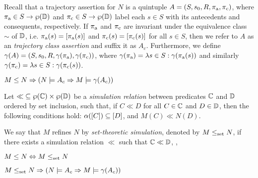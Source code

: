 
Recall that a trajectory assertion for $N$ is a quintuple $A = (S, s_{0}, R, \operatorname{\pi_{\textrm{a}}}, \operatorname{\pi_{\textrm{c}}})$, where $\operatorname{\pi_{\textrm{a}}} \in S \rightarrow \wp(\mathbb{D})$ and $\operatorname{\pi_{\textrm{c}}} \in S \rightarrow \wp(\mathbb{D})$ label each $s \in S$ with its antecedents and consequents, respectively. If $\operatorname{\pi_{\textrm{a}}}$ and $\operatorname{\pi_{\textrm{c}}}$ are invariant under the equivalence class $\sim$ of $\mathbb{D}$, i.e. $\operatorname{\pi_{\textrm{a}}}(s) = [\operatorname{\pi_{\textrm{a}}}(s)]$ and $\operatorname{\pi_{\textrm{c}}}(s) = [\operatorname{\pi_{\textrm{c}}}(s)]$ for all $s \in S$, then we refer to $A$ as an \textit{trajectory class assertion} and suffix it as $A_{c}$. Furthermore, we define $\gamma(A) = (S, s_{0}, R, \gamma(\operatorname{\pi_{\textrm{a}}}), \gamma(\operatorname{\pi_{\textrm{c}}}))$, where $\gamma(\operatorname{\pi_{\textrm{a}}}) = \lambda s \in S : \gamma(\operatorname{\pi_{\textrm{a}}}(s))$ and similarly $\gamma(\operatorname{\pi_{\textrm{c}}}) = \lambda s \in S : \gamma(\operatorname{\pi_{\textrm{c}}}(s))$.
%
\begin{theorem} \label{thm:traj-refines}
$M \leq N \Rightarrow (N \models A_{c} \Rightarrow M \models \gamma(A_{c}))$
\end{theorem}

Let ${\ll} \subseteq \wp(\mathbb{C}) \times \wp(\mathbb{D})$ be a \textit{simulation relation} between predicates $\mathbb{C}$ and $\mathbb{D}$ ordered by set inclusion, such that, if $C \ll D$ for all $C \in \mathbb{C}$ and $D \in \mathbb{D}$, then the following conditions hold: $\alpha([C]) \subseteq [D]$, and $M(C) \ll N(D)$. 

We say that $M$ refines $N$ by \textit{set-theoretic simulation}, denoted by $M \leq_{\textrm{set}} N$, if there exists a simulation relation $\ll$ such that $\mathbb{C} \ll \mathbb{D}$, , 
%
\begin{theorem} \label{thm:traj-equal-set}
$M \leq N \Leftrightarrow M \leq_{\textrm{set}} N$
\end{theorem}

\begin{theorem} \label{thm:sim-refines}
$M \leq_{\textrm{set}} N \Rightarrow (N \models A_{c} \Rightarrow M \models \gamma(A_{c}))$
\end{theorem}


